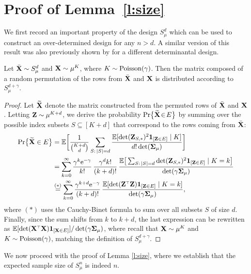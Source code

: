 


\section{Proof of Lemma~\ref{l:size}}
\label{appx: proof-of-l-size}

We first record an important property of the design $S_\mu^d$
which can be used to construct an over-determined design for any $n>d$. A similar
version of this result was also previously shown by
\cite{correcting-bias-journal} for a different determinantal design.

\begin{lemma}\label{l:decomposition}
  Let ${\bar{\mathbf X}}\sim S_\mu^d$ and $\mathbf X\sim \mu^K$, where
  $K\sim{\operatorname{Poisson}}(\gamma)$. Then the matrix composed of a random
  permutation of the rows from ${\bar{\mathbf X}}$ and $\mathbf X$ is distributed according to
  $S_\mu^{d+\gamma}$.
\end{lemma}

\begin{proof}
Let $\widetilde{\mathbf{X}}$ denote the matrix constructed from the permuted rows of
${\bar{\mathbf X}}$ and $\mathbf X$.  Letting $\mathbf Z\sim\mu^{K+d}$, we derive the probability
$\mathrm{Pr}\big\{\widetilde{\mathbf{X}}\!\in\! E\big\}$ by summing over the possible index subsets  $S\subseteq
[K+d]$ that correspond to the rows coming from ${\bar{\mathbf X}}$:
\begin{align*}
  \Pr\big\{\Xt\in E\big\} &= \E\bigg[\frac{1}{\binom{K+d}{d}}
  \sum_{S:\,|S|=d}\frac{\E[\det(\Z_{S,*})^2\one_{[\Z\in E]}\mid
  K]}{d!\det(\Sigmab_\mu)}\bigg]\\
  &=\sum_{k=0}^\infty
    \frac{\gamma^k\ee^{-\gamma}}{k!}\,\frac{\gamma^dk!}{(k+d)!}\,
    \frac{\E\big[\sum_{S:\,|S|=d}\det(\Z_{S,*})^2\one_{[\Z\in E]}\mid
    K=k\big]}{\det(\gamma\Sigmab_\mu)}\\
  &\overset{(*)}{=} \sum_{k=0}^\infty
    \frac{\gamma^{k+d}\ee^{-\gamma}}{(k+d)!}
    \,\frac{\E[\det(\Z^\top\Z)\one_{[\Z\in E]}\mid K=k]}{\det(\gamma\Sigmab_\mu)},
\end{align*}
where $(*)$ uses the Cauchy-Binet formula to sum over all subsets $S$
of size $d$. Finally, since the sum shifts from $k$
to $k+d$, the last expression can be rewritten as
$\E[\det(\X^\top\X)\one_{[\X\in E]}]/\det(\gamma\Sigmab_\mu)$, where recall that
$\mathbf X\sim\mu^K$ and $K\sim{\operatorname{Poisson}}(\gamma)$, matching the definition of $S_\mu^{d+\gamma}$.
\end{proof}

We now proceed with the proof of Lemma \ref{l:size}, where we establish
that the expected sample size of $S_\mu^n$ is indeed $n$.

